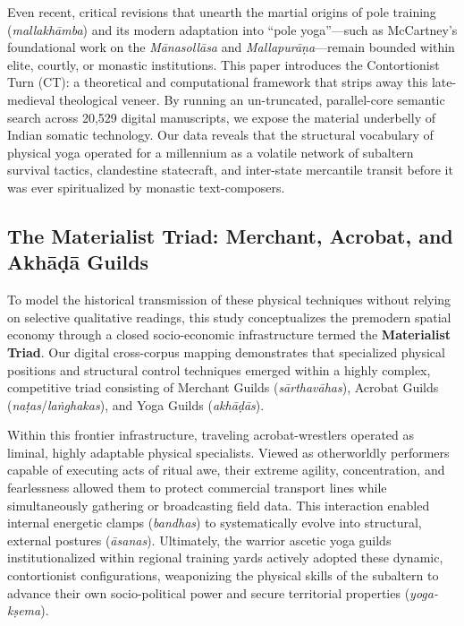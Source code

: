 \documentclass[11pt,twoside,letterpaper]{article}
\begin{document}
Even recent, critical revisions that unearth the martial origins of pole training (\textit{mallakhāmba}) and its modern adaptation into ``pole yoga''—such as McCartney’s foundational work on the \textit{Mānasollāsa} and \textit{Mallapurāṇa}—remain bounded within elite, courtly, or monastic institutions. This paper introduces the Contortionist Turn (CT): a theoretical and computational framework that strips away this late-medieval theological veneer. By running an un-truncated, parallel-core semantic search across 20,529 digital manuscripts, we expose the material underbelly of Indian somatic technology. Our data reveals that the structural vocabulary of physical yoga operated for a millennium as a volatile network of subaltern survival tactics, clandestine statecraft, and inter-state mercantile transit before it was ever spiritualized by monastic text-composers.

\subsection{The Materialist Triad: Merchant, Acrobat, and Akhāḍā Guilds}
To model the historical transmission of these physical techniques without relying on selective qualitative readings, this study conceptualizes the premodern spatial economy through a closed socio-economic infrastructure termed the \textbf{Materialist Triad}. Our digital cross-corpus mapping demonstrates that specialized physical positions and structural control techniques emerged within a highly complex, competitive triad consisting of Merchant Guilds (\textit{sārthavāhas}), Acrobat Guilds (\textit{naṭas}/\textit{laṅghakas}), and Yoga Guilds (\textit{akhāḍās}).

Within this frontier infrastructure, traveling acrobat-wrestlers operated as liminal, highly adaptable physical specialists. Viewed as otherworldly performers capable of executing acts of ritual awe, their extreme agility, concentration, and fearlessness allowed them to protect commercial transport lines while simultaneously gathering or broadcasting field data. This interaction enabled internal energetic clamps (\textit{bandhas}) to systematically evolve into structural, external postures (\textit{āsanas}). Ultimately, the warrior ascetic yoga guilds institutionalized within regional training yards actively adopted these dynamic, contortionist configurations, weaponizing the physical skills of the subaltern to advance their own socio-political power and secure territorial properties (\textit{yoga-kṣema}).
\end{document}
